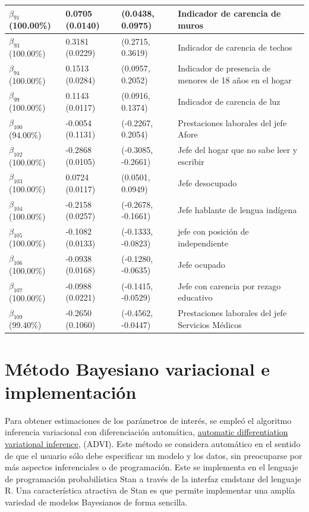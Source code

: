 \documentclass[11pt]{article}
\begin{document}
\begin{table}[H]
\begin{tabular}[t]{l|l|l|l}
\hline
$\beta_{91}$ (100.00\%) & 0.0705 (0.0140) & (0.0438, 0.0975) & Indicador de carencia de muros\\
\hline
$\beta_{93}$ (100.00\%) & 0.3181 (0.0229) & (0.2715, 0.3619) & Indicador de carencia de techos\\
\hline
$\beta_{94}$ (100.00\%) & 0.1513 (0.0284) & (0.0957, 0.2052) & Indicador de presencia de menores de 18 años en el hogar\\
\hline
$\beta_{99}$ (100.00\%) & 0.1143 (0.0117) & (0.0916, 0.1374) & Indicador de carencia de luz\\
\hline
$\beta_{100}$ (94.00\%) & -0.0054 (0.1131) & (-0.2267, 0.2054) & Prestaciones laborales del jefe Afore\\
\hline
$\beta_{102}$ (100.00\%) & -0.2868 (0.0105) & (-0.3085, -0.2661) & Jefe del hogar que no sabe leer y escribir\\
\hline
$\beta_{103}$ (100.00\%) & 0.0724 (0.0117) & (0.0501, 0.0949) & Jefe desocupado\\
\hline
$\beta_{104}$ (100.00\%) & -0.2158 (0.0257) & (-0.2678, -0.1661) & Jefe hablante de lengua indígena\\
\hline
$\beta_{105}$ (100.00\%) & -0.1082 (0.0133) & (-0.1333, -0.0823) & jefe con posición de independiente\\
\hline
$\beta_{106}$ (100.00\%) & -0.0938 (0.0168) & (-0.1280, -0.0635) & Jefe ocupado\\
\hline
$\beta_{107}$ (100.00\%) & -0.0988 (0.0221) & (-0.1415, -0.0529) & Jefe con carencia por rezago educativo\\
\hline
$\beta_{109}$ (99.40\%) & -0.2650 (0.1060) & (-0.4562, -0.0447) & Prestaciones laborales del jefe Servicios Médicos\\
\hline
\end{tabular}
\end{table}


\section*{Método Bayesiano variacional e implementación}
Para obtener estimaciones de los parámetros de interés, se empleó el algoritmo inferencia variacional con diferenciación automática, \underline{automatic differentiation variational inference}, (ADVI). Este método se considera automático en el sentido de que el usuario sólo debe especificar un modelo y los datos, sin preocuparse por más aspectos inferenciales o de programación. Este se implementa en el lenguaje de programación probabilística Stan a través de la interfaz cmdstanr del lenguaje R. Una característica atractiva de Stan es que permite implementar una amplía variedad de modelos Bayesianos de forma sencilla.
\end{document}
